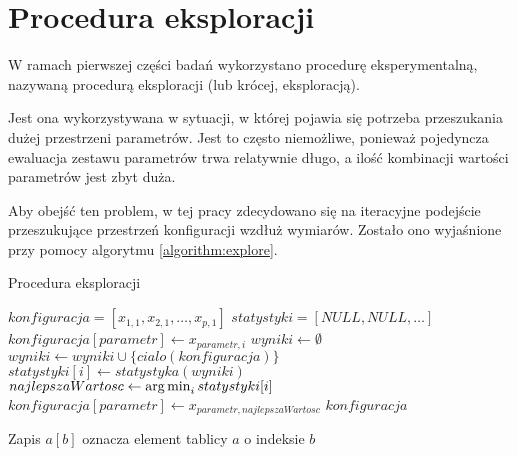 \documentclass[./FM_mgr.tex]{subfiles}
\begin{document}
\appendix
\chapter{Procedura eksploracji} \label{appendix:explore}

W ramach pierwszej części badań wykorzystano procedurę eksperymentalną, nazywaną procedurą eksploracji (lub krócej, eksploracją).

Jest ona wykorzystywana w sytuacji, w której pojawia się potrzeba przeszukania dużej przestrzeni parametrów.
Jest to często niemożliwe, ponieważ pojedyncza ewaluacja zestawu parametrów trwa relatywnie długo, a ilość kombinacji wartości parametrów jest zbyt duża.

Aby obejść ten problem, w tej pracy zdecydowano się na iteracyjne podejście przeszukujące przestrzeń konfiguracji wzdłuż wymiarów.
Zostało ono wyjaśnione przy pomocy algorytmu \ref{algorithm:explore}.

\clearpage

\begin{algorithm}[H]
	\caption{Procedura eksploracji \label{algorithm:explore}}
	\begin{algorithmic}[1]
		\Start
		\Var $konfiguracja = [x_{1, 1}, x_{2, 1}, \ldots, x_{p, 1}]$
		\Var $statystyki = [NULL, NULL, \ldots]$ 
		\State $konfiguracja[parametr] \gets x_{parametr, i}$ 
		\Var $wyniki \gets \emptyset$
		\State $wyniki \gets wyniki \cup \{ cialo(konfiguracja) \}$
		\EndFor
		\State $statystyki[i] \gets statystyka(wyniki)$
		\EndFor
		\Var $najlepszaWartosc \gets \operatorname*{arg\,min}_{i} statystyki[i]$
		\State $konfiguracja[parametr] \gets x_{parametr, najlepszaWartosc}$
		\EndFor
		\EndFor
		\State \Return $konfiguracja$
		\EndOperator
	\end{algorithmic}
	Zapis $a[b]$ oznacza element tablicy $a$ o indeksie $b$
\end{algorithm}
\end{document}
